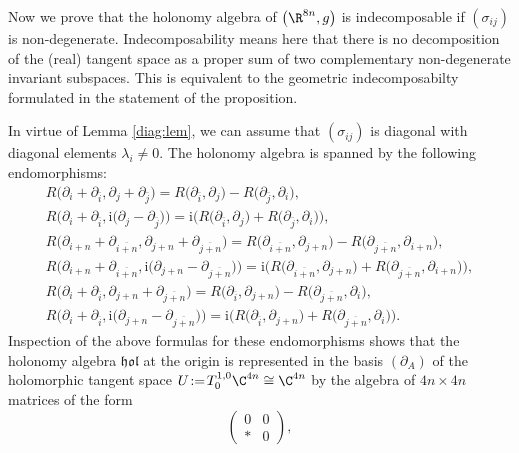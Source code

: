 Now we prove that the holonomy algebra of $\bigl(\R^{8n},g\bigr)$ is indecomposable if $(\sigma_{ij})$ is non-degenerate.
Indecomposability means here that there is no decomposition of the (real) tangent space as a proper sum of two complementary non-degenerate invariant subspaces. This is equivalent to the geometric indecomposabilty formulated in the statement of the proposition.

In virtue of Lemma \ref{diag:lem}, we can assume that $(\sigma_{ij})$ is diagonal
with diagonal elements $\lambda_i\neq 0$.
The holonomy algebra is spanned by the following endomorphisms:
\begin{gather*}
R\bigl(\partial_i + \partial_{\bar i},\partial_j+\partial_{\bar j}\bigr) = R\bigl(\partial_{\bar i}, \partial_j\bigr) - R\bigl(\partial_{\bar j}, \partial_i\bigr),\\
R\bigl(\partial_i + \partial_{\bar i},\mathrm{i}\bigl(\partial_j-\partial_{\bar j}\bigr)\bigr) = \mathrm{i}\bigl(R\bigl(\partial_{\bar i}, \partial_j\bigr) +
R\bigl(\partial_{\bar j}, \partial_i\bigr)\bigr),\\
R\bigl(\partial_{i+n} + \partial_{\overline{i+n}},\partial_{j+n}+\partial_{\overline{j+n}}\bigr) = R\bigl(\partial_{\overline{i+n}}, \partial_{j+n}\bigr) - R\bigl(\partial_{\overline{j+n}}, \partial_{i+n}\bigr),\\
R\bigl(\partial_{i+n} + \partial_{\overline{i+n}},\mathrm{i}\bigl(\partial_{j+n}-\partial_{\overline{j+n}}\bigr)\bigr) = \mathrm{i}\bigl(R\bigl(\partial_{\overline{i+n}}, \partial_{j+n}\bigr) + R\bigl(\partial_{\overline{j+n}}, \partial_{i+n}\bigr)\bigr),\\
R\bigl(\partial_{i} + \partial_{\overline{i}},\partial_{j+n}+\partial_{\overline{j+n}}\bigr) = R\bigl(\partial_{\overline{i}}, \partial_{j+n}\bigr) - R\bigl(\partial_{\overline{j+n}}, \partial_{i}\bigr),\\
R\bigl(\partial_{i} + \partial_{\overline{i}},\mathrm{i}\bigl(\partial_{j+n}-\partial_{\overline{j+n}}\bigr)\bigr) = \mathrm{i}\bigl(R\bigl(\partial_{\overline{i}}, \partial_{j+n}\bigr) + R\bigl(\partial_{\overline{j+n}}, \partial_{i}\bigr)\bigr).
\end{gather*}
Inspection of the above formulas for these endomorphisms shows that the holonomy algebra $\mathfrak{hol}$ at the origin is represented
in the basis $(\partial_A)$ of the holomorphic tangent space ${U\!:=\!T_0^{1,0}\C^{4n}\cong \C^{4n}}$ by the algebra of $4n \times 4n$ matrices of the form
\[ \begin{pmatrix}0&0\\\ast &0\end{pmatrix},\]

